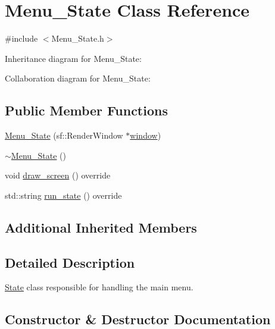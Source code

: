 \hypertarget{classMenu__State}{}\section{Menu\+\_\+\+State Class Reference}
\label{classMenu__State}


{\ttfamily \#include $<$Menu\+\_\+\+State.\+h$>$}



Inheritance diagram for Menu\+\_\+\+State\+:


Collaboration diagram for Menu\+\_\+\+State\+:
\subsection*{Public Member Functions}
\begin{DoxyCompactItemize}
\item 
\hyperlink{classMenu__State_a0d39c57b0f4365e09fa11bd0991ffae4}{Menu\+\_\+\+State} (sf\+::\+Render\+Window $\ast$\hyperlink{classState_ae6259a383c98ae7496266a76a9daf478}{window})
\item 
\hyperlink{classMenu__State_a765dfb5f654ab9698ad24bfa99fa0715}{$\sim$\+Menu\+\_\+\+State} ()
\item 
void \hyperlink{classMenu__State_a30c6a5c755eea65e117b6c6772afad27}{draw\+\_\+screen} () override
\item 
std\+::string \hyperlink{classMenu__State_a727db35b408300360c261db80399088e}{run\+\_\+state} () override
\end{DoxyCompactItemize}
\subsection*{Additional Inherited Members}


\subsection{Detailed Description}
\hyperlink{classState}{State} class responsible for handling the main menu. 

\subsection{Constructor \& Destructor Documentation}
\mbox{\label{classMenu__State_a0d39c57b0f4365e09fa11bd0991ffae4}} 
